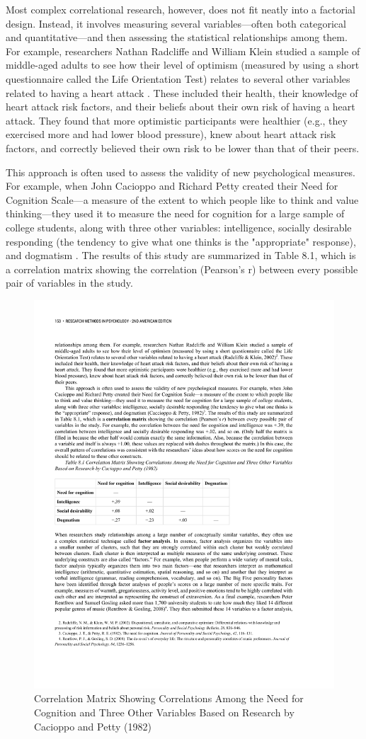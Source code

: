 Most complex correlational research, however, does not fit neatly into a factorial design. Instead, it involves measuring several variables---often both categorical and quantitative---and then assessing the statistical relationships among them. For example, researchers Nathan Radcliffe and William Klein studied a sample of middle-aged adults to see how their level of optimism (measured by using a short questionnaire called the Life Orientation Test) relates to several other variables related to having a heart attack \citep{radcliffe_dispositional_2002}. These included their health, their knowledge of heart attack risk factors, and their beliefs about their own risk of having a heart attack. They found that more optimistic participants were healthier (e.g., they exercised more and had lower blood pressure), knew about heart attack risk factors, and correctly believed their own risk to be lower than that of their peers.

This approach is often used to assess the validity of new psychological measures. For example, when John Cacioppo and Richard Petty created their Need for Cognition Scale---a measure of the extent to which people like to think and value thinking---they used it to measure the need for cognition for a large sample of college students, along with three other variables: intelligence, socially desirable responding (the tendency to give what one thinks is the "appropriate" response), and dogmatism \citep{cacioppo_need_1982}. The results of this study are summarized in Table 8.1, which is a correlation matrix showing the correlation (Pearson's r) between every possible pair of variables in the study. 

\begin{figure}

\includegraphics[width=.7\linewidth]{figures/C8need.pdf}

\caption{Correlation Matrix Showing Correlations Among the Need for Cognition and Three Other Variables Based on Research by Cacioppo and Petty (1982)}

\label{fig:need}

\end{figure}

